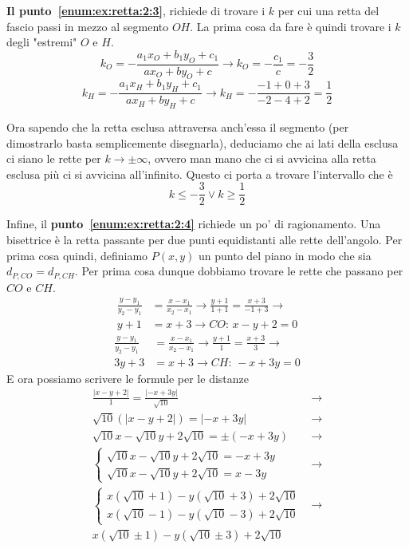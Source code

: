 \textbf{Il punto~\ref{enum:ex:retta:2:3}}, richiede di trovare i $k$ per cui una retta del fascio 
passi in mezzo al segmento $OH$. La prima cosa da fare è quindi trovare i $k$ degli "estremi" $O$ e
$H$.
\begin{equation*}
  k_O = -\frac{a_1x_O+b_1y_O+c_1}{ax_O+by_O+c} \rightarrow k_O = -\frac{c_1}{c} = -\frac{3}{2}
\end{equation*}
\begin{equation*}
  k_H = -\frac{a_1x_H+b_1y_H+c_1}{ax_H+by_H+c} \rightarrow k_H = -\frac{-1+0+3}{-2-4+2} = \frac{1}{2}
\end{equation*}

Ora sapendo che la retta esclusa attraversa anch'essa il segmento (per dimostrarlo basta 
semplicemente disegnarla), deduciamo che ai lati della esclusa ci siano le rette per $k\to\pm\infty$,
ovvero man mano che ci si avvicina alla retta esclusa più ci si avvicina all'infinito. Questo ci porta
a trovare l'intervallo che è
\begin{equation*}
  \boxed{k\leq-\frac{3}{2} \vee k\geq\frac{1}{2}}
\end{equation*}

Infine, il \textbf{punto~\ref{enum:ex:retta:2:4}} richiede un po' di ragionamento. Una bisettrice è la
retta passante per due punti equidistanti alle rette dell'angolo. Per prima cosa quindi, definiamo
$P(x,y)$ un punto del piano in modo che sia $d_{P,CO} = d_{P,CH}$. Per prima cosa dunque dobbiamo 
trovare le rette che passano per $CO$ e $CH$.
\begin{align*}
  \frac{y-y_1}{y_2-y_1} &= \frac{x-x_1}{x_2-x_1} \rightarrow
  \frac{y+1}{1+1} = \frac{x+3}{-1+3} \rightarrow\\
  y+1 &= x+3 \rightarrow CO:\, x-y+2 = 0
\end{align*}
\begin{align*}
  \frac{y-y_1}{y_2-y_1} &= \frac{x-x_1}{x_2-x_1} \rightarrow
  \frac{y+1}{1}= \frac{x+3}{3} \rightarrow\\
  3y+3 &= x+3 \rightarrow CH:\, -x+3y=0
\end{align*}
E ora possiamo scrivere le formule per le distanze
\begin{align*}
  \frac{\lvert x-y+2\rvert}{1} = \frac{\lvert -x+3y\rvert}{\sqrt{10}} &\rightarrow\\
  \sqrt{10}(\lvert x-y+2\rvert) = \lvert -x+3y\rvert &\rightarrow\\
  \sqrt{10}x-\sqrt{10}y+2\sqrt{10} = \pm(-x+3y) &\rightarrow\\
  \begin{cases}
    \sqrt{10}x-\sqrt{10}y+2\sqrt{10} = -x+3y\\
    \sqrt{10}x-\sqrt{10}y+2\sqrt{10} = x-3y
  \end{cases} &\rightarrow\\
  \begin{cases}
    x(\sqrt{10}+1)-y(\sqrt{10}+3) + 2\sqrt{10}\\
    x(\sqrt{10}-1)-y(\sqrt{10}-3) + 2\sqrt{10}
  \end{cases} &\rightarrow\\
  \boxed{x(\sqrt{10}\pm1)-y(\sqrt{10}\pm3)+2\sqrt{10}}
\end{align*}

